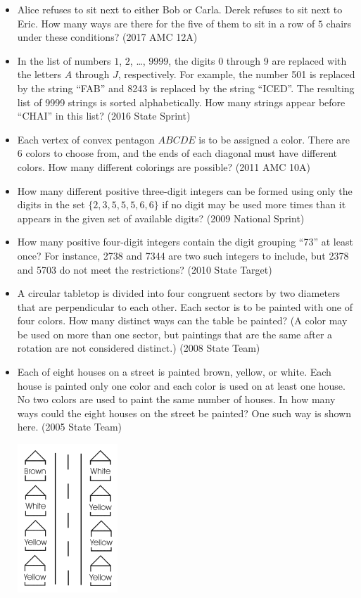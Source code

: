 \documentclass{article}
\begin{document}
\begin{itemize}
\item Alice refuses to sit next to either Bob or Carla. Derek refuses to sit next to Eric. How many ways are there for the five of them to sit in a row of $5$ chairs under these conditions? (2017 AMC 12A)


\item In the list of numbers $1$, $2$, \ldots, $9999$, the digits 0 through 9 are replaced with the letters $A$ through $J$, respectively. For example, the number 501 is replaced by the string ``FAB'' and 8243 is replaced by the string ``ICED''. The resulting list of 9999 strings is sorted alphabetically. How many strings appear before ``CHAI'' in this list? (2016 State Sprint)

\item Each vertex of convex pentagon $ABCDE$ is to be assigned a color. There are $6$ colors to choose from, and the ends of each diagonal must have different colors. How many different colorings are possible? (2011 AMC 10A)

\item How many different positive three-digit integers can be formed using only the digits in the set $\{ 2, 3, 5, 5, 5, 6, 6 \}$ if no digit may be used more times than it appears in the given set of available digits? (2009 National Sprint)

\item How many positive four-digit integers contain the digit grouping ``73'' at least once? For instance, 2738 and 7344 are two such integers to include, but 2378 and 5703 do not meet the restrictions? (2010 State Target)

\item A circular tabletop is divided into four congruent sectors by two diameters that are perpendicular to each other. Each sector is to be painted with one of four colors. How many distinct ways can the table be painted? (A color may be used on more than one sector, but paintings that are the same after a rotation are not considered distinct.) (2008 State Team)


\item Each of eight houses on a street is painted brown, yellow, or white. Each house is painted only one color and each color is used on at least one house. No two colors are used to paint the same number of houses. In how many ways could the eight houses on the street be painted? One such way is shown here. (2005 State Team)

\centerline{\includegraphics{2005Team.png}}


\end{itemize}
\end{document}
